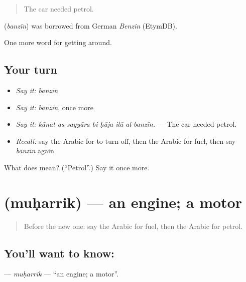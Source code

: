 \begin{quote}
The car needed petrol.
\end{quote}

\begin{cousinweb}
\textbf{} (\emph{banzīn}) was borrowed from German \emph{Benzin} (EtymDB).
\end{cousinweb}

\begin{grammarlens}[title={What you've built}]
One more word for getting around.
\end{grammarlens}

\subsection*{Your turn}
\begin{itemize}
\raggedright
  \item \emph{Say it:} \emph{banzīn}
  \item \emph{Say it:} \emph{banzīn}, once more
  \item \emph{Say it:} \emph{kānat as-sayyāra bi-ḥāja ilā al-banzīn.} — The car needed petrol.
  \item \emph{Recall:} say the Arabic for to turn off, then the Arabic for fuel, then say \emph{banzīn} again
\end{itemize}

\begin{tcolorbox}[breakable,colback=teal!4,colframe=teal!35!black,title={Before you move on}]
What does  mean? (\textquotedblleft{}Petrol\textquotedblright{}.) Say it once more.
\end{tcolorbox}
\section[\texorpdfstring{\ar{محرك} (muḥarrik)}{محرك (muḥarrik)}]{ (muḥarrik) — an engine; a motor}

\label{lesson:AR-C432-muharrik}



\begin{quote}
Before the new one: say the Arabic for fuel, then the Arabic for petrol.
\end{quote}

\subsection*{You'll want to know: }
\textbf{} — \emph{muḥarrik} — \textquotedblleft{}an engine; a motor\textquotedblright{}.


